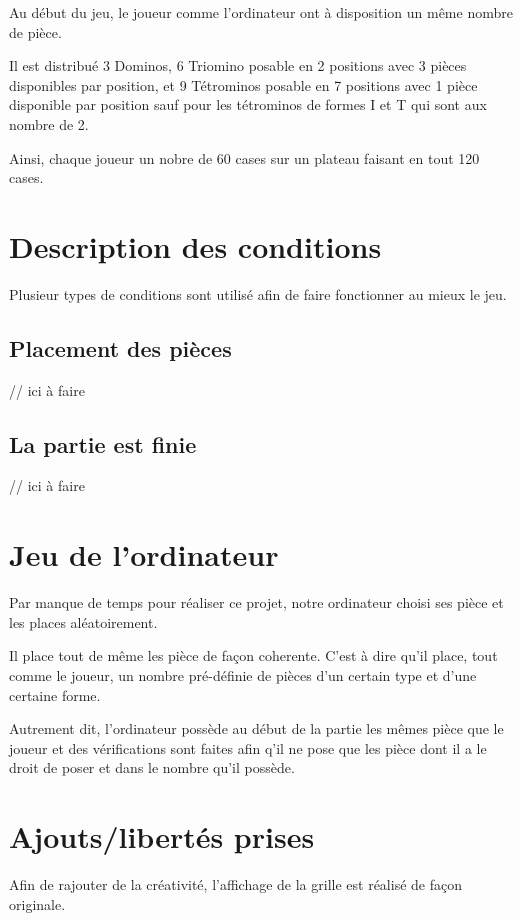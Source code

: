\documentclass[a4paper, titlepage, french]{report}
\begin{document}
Au début du jeu, le joueur comme l'ordinateur ont à disposition un même nombre de pièce.
\bigskip

Il est distribué 3 Dominos, 6 Triomino posable en 2 positions avec 3 pièces disponibles par position, et 9 Tétrominos posable en 7 positions avec 1 pièce disponible par position sauf pour les tétrominos de formes I et T qui sont aux nombre de 2.

Ainsi, chaque joueur un nobre de 60 cases sur un plateau faisant en tout 120 cases.

\chapter{Description des conditions}

Plusieur types de conditions sont utilisé afin de faire fonctionner au mieux le jeu.

\section{Placement des pièces}

\color{red}
// ici à faire
\color{black}


\section{La partie est finie}

\color{red}
// ici à faire
\color{black}


\chapter{Jeu de l'ordinateur}

Par manque de temps pour réaliser ce projet, notre ordinateur choisi ses pièce et les places aléatoirement.
\bigskip

Il place tout de même les pièce de façon coherente. C'est à dire qu'il place, tout comme le joueur, un nombre pré-définie de pièces d'un certain type et d'une certaine forme.

Autrement dit, l'ordinateur possède au début de la partie les mêmes pièce que le joueur et des vérifications sont faites afin q'il ne pose que les pièce dont il a le droit de poser et dans le nombre qu'il possède.
\chapter{Ajouts/libertés prises}

Afin de rajouter de la créativité, l'affichage de la grille est réalisé de façon originale.
\bigskip
\end{document}
